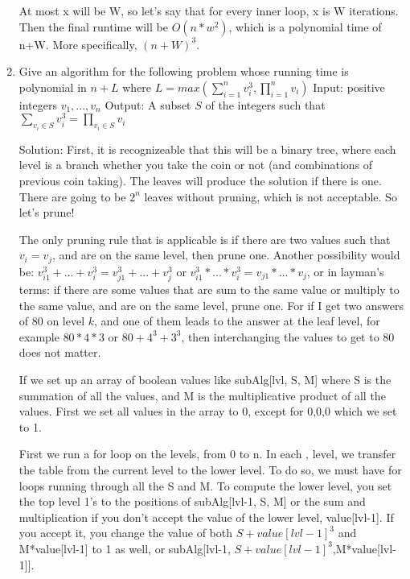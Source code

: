 \documentclass{article}
\begin{document}
\begin{enumerate}
At most x will be W, so let's say that for every inner loop, x is W iterations. Then the final runtime will be $O(n*w^2)$, which is a polynomial time of n+W. More specifically, $(n+W)^3$.

\item Give an algorithm for the following problem whose running time is polynomial in $n+L$ where 
\newline $L= max(\sum\limits_{i=1}^{n}v_{i}^{3}, \prod\limits_{i=1}^{n}v_{i} )$
\newline Input: positive integers $v_{1}, ..., v_{n}$
\newline Output: A subset $S$ of the integers such that $\sum_{v_{i} \in S} v_{i}^{3} = \prod_{v_{i}\in S} v_{i}$

Solution: First, it is recognizeable that this will be a binary tree, where each level is a branch whether you take the coin or not (and combinations of previous coin taking). The leaves will produce the solution if there is one. There are going to be $2^n$ leaves without pruning, which is not acceptable. So let's prune!

The only pruning rule that is applicable is if there are two values such that $v_i = v_j$, and are on the same level, then prune one. Another possibility would be: $v_{i1}^3 + ... +v_i^3  = v_{j1}^3 +...+v_{j}^3 $ or $v_{i1}^3 * ... *v_i^3  = v_{j1} *...*v_{j}$, or in layman's terms: if there are some values that are sum to the same value or multiply to the same value, and are on the same level, prune one. For if I get two answers of 80 on level $k$, and one of them leads to the answer at the leaf level, for example $80*4*3$ or $80 + 4^3 + 3^3$, then interchanging the values to get to 80 does not matter.

If we set up an array of boolean values like subAlg[lvl, S, M] where S is the summation of all the values, and M is the multiplicative product of all the values. First we set all values in the array to 0, except for 0,0,0 which we set to 1. 

First we run a for loop on the levels, from 0 to n. In each , level, we transfer the table from the current level to the lower level. To do so, we must have for loops running through all the S and M. To compute the lower level, you set the top level 1's to the positions of subAlg[lvl-1, S, M] or the sum and multiplication if you don't accept the value of the lower level, value[lvl-1]. If you accept it, you change the value of both $S+value[lvl-1]^3$ and M*value[lvl-1] to 1 as well, or subAlg[lvl-1, $S+value[lvl-1]^3$,M*value[lvl-1]]. 


\end{enumerate}
\end{document}
